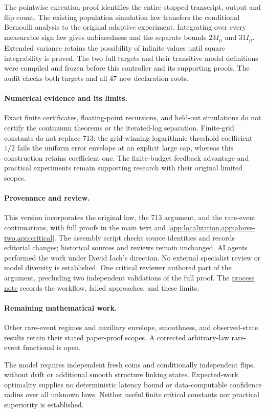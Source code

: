 The pointwise execution proof identifies the entire stopped transcript,
output and flip count. The existing population simulation law transfers
the conditional Bernoulli analysis to the original adaptive experiment.
Integrating over every measurable sign law gives unbiasedness and the
separate bounds $23I_\mu$ and $31I_\mu$. Extended variance retains the
possibility of infinite values until square integrability is proved.
The two full targets and their transitive model definitions were compiled
and frozen before this controller and its supporting proofs. The audit
checks both targets and all 47 new declaration roots.

\paragraph{Numerical evidence and its limits.}
Exact finite certificates, floating-point recursions, and held-out
simulations do not certify the continuum theorems or the iterated-log
separation. Finite-grid constants do not replace 713: the grid-winning
logarithmic threshold coefficient $1/2$ fails the uniform error envelope
at an explicit large cap, whereas this construction retains coefficient
one. The finite-budget feedback advantage and practical experiments
remain supporting research with their original limited scopes.

\paragraph{Provenance and review.}
This version incorporates the original law, the 713 argument, and the
rare-event continuations, with full proofs in the main text and
\cref{app:localization,app:above-two,app:critical}.
The assembly script checks source identities and records editorial
changes; historical sources and reviews remain unchanged.
AI agents performed the work under David Iach's direction. No external
specialist review or model diversity is established. One critical
reviewer authored part of the argument, precluding two independent
validations of the full proof. The
\href{https://github.com/davidiach/adaptive-threshold-estimation/blob/6009662a5581b31de17c8956b6fd93e4279ba087/docs/process/METHOD.md}{process note}
records the workflow, failed approaches, and these limits.

\paragraph{Remaining mathematical work.}
Other rare-event regimes and auxiliary envelope, smoothness, and observed-state
results retain their stated paper-proof scopes.
A corrected arbitrary-law rare-event functional is open.

The model requires independent fresh coins and conditionally independent
flips, without drift or additional smooth structure linking states.
Expected-work optimality supplies no deterministic latency bound or
data-computable confidence radius over all unknown laws. Neither useful
finite critical constants nor practical superiority is established.
